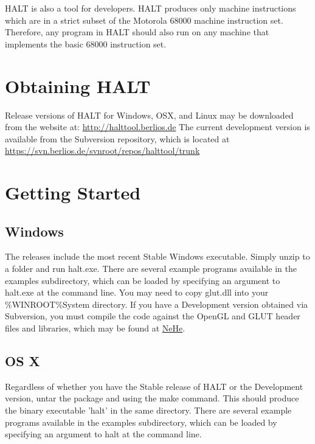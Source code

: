 \documentclass[10pt,fullpage]{article}
\begin{document}
HALT is also a tool for developers. HALT produces only machine
instructions which are in a strict subset of the Motorola 68000
machine instruction set. Therefore, any program in HALT should also
run on any machine that implements the basic 68000 instruction set.

\section*{Obtaining HALT}

Release versions of HALT for Windows, OSX, and Linux may be
downloaded from the website at:
\href{http://halttool.berlios.de}{http://halttool.berlios.de} The
current development version is available from the Subversion
repository, which is located at
\href{https://svn.berlios.de/svnroot/repos/halttool/trunk}{https://svn.berlios.de/svnroot/repos/halttool/trunk}


\section*{Getting Started}
\subsection*{Windows}
The releases include the most recent Stable Windows executable.
Simply unzip to a folder and run halt.exe. There are several example
programs available in the examples subdirectory, which can be loaded
by specifying an argument to halt.exe at the command line. You may
need to copy glut.dll into your \%WINROOT\%System directory. If you
have a Development version obtained via Subversion, you must compile
the code against the OpenGL and GLUT header files and libraries,
which may be found at
\href{http://nehe.gamedev.org}{NeHe}.\\

\subsection*{OS X}
Regardless of whether you have the Stable release of HALT or the
Development version, untar the package and using the make command.
This should produce the binary executable 'halt' in the same
directory. There are several example programs available in the
examples subdirectory, which can be loaded by specifying an argument
to halt at the command line.
\end{document}
